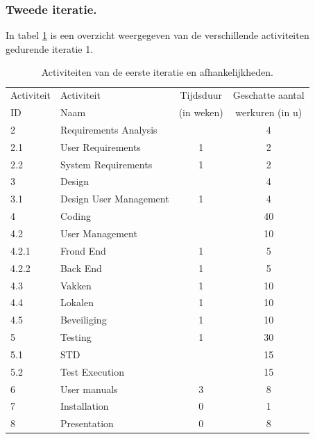 \subsubsection{Tweede iteratie.}
In tabel \ref{tab:ActivityDependenciesIteratie2} is een overzicht weergegeven van de verschillende activiteiten gedurende iteratie 1.
\begin{table} [H]
	\centering
	\caption{Activiteiten van de eerste iteratie en afhankelijkheden.}
	\begin{tabular} {l|l|c|c}
		Activiteit & Activiteit & Tijdsduur & Geschatte aantal  \\
		ID & Naam & (in weken) & werkuren (in u) \\
		\hline
		2 	& Requirements Analysis 		&   & 4   	\\
		2.1 & User Requirements 			& 1 & 2  	\\
		2.2 & System Requirements 		& 1 & 2  	\\
		\hline
		3 	& Design 					&   & 4 	\\
		3.1 & Design User Management 	& 1 & 4 	\\
		\hline
		4 	& Coding 					&   & 40 	\\
		4.2 & User Management			&   & 10   	\\
		4.2.1 & Frond End 		 		& 1 & 5  	\\
		4.2.2 & Back End					& 1 & 5 	\\
		4.3 & Vakken 					& 1	& 10		\\
		4.4 & Lokalen					& 1	& 10		\\
		4.5 & Beveiliging				& 1	& 10		\\
		\hline
		5 	& Testing 					& 1 & 30  	\\
		5.1 & STD						&   & 15  	\\
		5.2 & Test Execution				&   & 15  	\\
		\hline
		6 	& User manuals 				& 3 & 8  	\\
		\hline
		7 	& Installation 				& 0 & 1  	\\
		\hline
		8 	& Presentation 				& 0 & 8 		\\
	\end{tabular}
	\label{tab:ActivityDependenciesIteratie2}
\end{table}


